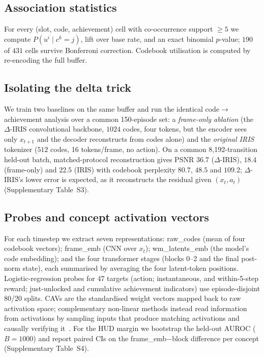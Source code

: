 \documentclass[pdflatex,sn-mathphys-num]{sn-jnl}%
\theoremstyle{thmstyleone}%
\theoremstyle{thmstyletwo}%
\theoremstyle{thmstylethree}%
\newcommand{\deltairis}{$\Delta$-IRIS}
\begin{document}
\subsection{Association statistics}\label{m:assoc}
For every (slot, code, achievement) cell with co-occurrence support $\ge 5$ we compute $P(u^i\mid c^k{=}j)$, lift over base rate, and an exact binomial $p$-value; $190$ of $431$ cells survive Bonferroni correction. Codebook utilisation is computed by re-encoding the full buffer.

\subsection{Isolating the delta trick}\label{m:delta}
We train two baselines on the same buffer and run the identical code$\to$achievement analysis over a common 150-episode set: a \emph{frame-only ablation} (the \deltairis{} convolutional backbone, $1024$ codes, four tokens, but the encoder sees only $x_{t+1}$ and the decoder reconstructs from codes alone) and the \emph{original IRIS} tokenizer ($512$ codes, 16 tokens/frame, no action). On a common 8{,}192-transition held-out batch, matched-protocol reconstruction gives PSNR $36.7$ (\deltairis{}), $18.4$ (frame-only) and $22.5$ (IRIS) with codebook perplexity $80.7$, $48.5$ and $109.2$; \deltairis{}'s lower error is expected, as it reconstructs the residual given $(x_t,a_t)$ (Supplementary Table~S3).

\subsection{Probes and concept activation vectors}\label{m:probes}
For each timestep we extract seven representations: \textsf{raw\_codes} (mean of four codebook vectors); \textsf{frame\_emb} (CNN over $x_t$); \textsf{wm\_latents\_emb} (the model's code embedding); and the four transformer stages (blocks 0--2 and the final post-norm state), each summarised by averaging the four latent-token positions. Logistic-regression probes for 47 targets (action; instantaneous, and within-5-step reward; just-unlocked and cumulative achievement indicators) use episode-disjoint 80/20 splits. CAVs are the standardised weight vectors mapped back to raw activation space; complementary non-linear methods instead read information from activations by sampling inputs that produce matching activations and causally verifying it~\cite{huang2024inversionview}. For the HUD margin we bootstrap the held-out AUROC ($B{=}1000$) and report paired CIs on the \textsf{frame\_emb}$-$block difference per concept (Supplementary Table~S4).
\end{document}
